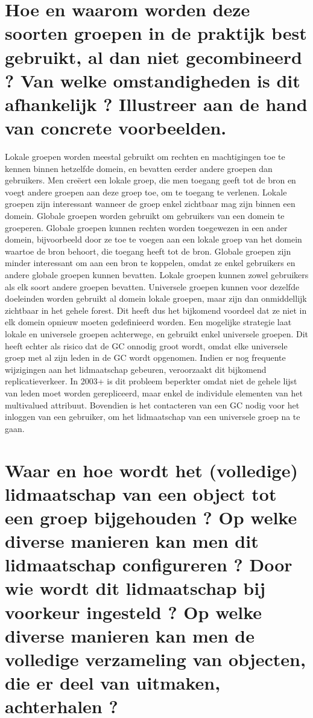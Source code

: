 
\clearpage
\section{Hoe en waarom worden deze soorten groepen in de praktijk best gebruikt, al dan niet gecombineerd ? Van welke omstandigheden is dit afhankelijk ? Illustreer aan de hand van concrete voorbeelden.}

Lokale groepen worden meestal gebruikt om rechten en machtigingen toe te kennen binnen hetzelfde domein, en bevatten eerder andere groepen dan gebruikers. Men cre\"eert een lokale groep, die men toegang geeft tot de bron en voegt andere groepen aan deze groep toe, om te toegang te verlenen. Lokale groepen zijn interessant wanneer de groep enkel zichtbaar mag zijn binnen een domein.
\npar
Globale groepen worden gebruikt om gebruikers van een domein te groeperen. Globale groepen kunnen rechten worden toegewezen in een ander domein, bijvoorbeeld door ze toe te voegen aan een lokale groep van het domein waartoe de bron behoort, die toegang heeft tot de bron. Globale groepen zijn minder interessant om aan een bron te koppelen, omdat ze enkel gebruikers en andere globale groepen kunnen bevatten. Lokale groepen kunnen zowel gebruikers als elk soort andere groepen bevatten.
\npar
Universele groepen kunnen voor dezelfde doeleinden worden gebruikt al domein lokale groepen, maar zijn dan onmiddellijk zichtbaar in het gehele forest. Dit heeft dus het bijkomend voordeel dat ze niet in elk domein opnieuw moeten gedefinieerd worden. Een mogelijke strategie laat lokale en universele groepen achterwege, en gebruikt enkel universele groepen. Dit heeft echter als risico dat de GC onnodig groot wordt, omdat elke universele groep met al zijn leden in de GC wordt opgenomen. Indien er nog frequente wijzigingen aan het lidmaatschap gebeuren, veroorzaakt dit bijkomend replicatieverkeer. In 2003+ is dit probleem beperkter omdat niet de gehele lijst van leden moet worden gerepliceerd, maar enkel de individule elementen van het multivalued attribuut. Bovendien is het contacteren van een GC nodig voor het inloggen van een gebruiker, om het lidmaatschap van een universele groep na te gaan.

\section{Waar en hoe wordt het (volledige) lidmaatschap van een object tot een groep bijgehouden ? Op welke diverse manieren kan men dit lidmaatschap configureren ? Door wie wordt dit lidmaatschap bij voorkeur ingesteld ? Op welke diverse manieren kan men de volledige verzameling van objecten, die er deel van uitmaken, achterhalen ?}

